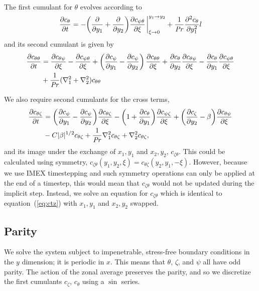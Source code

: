 \documentclass{jfm}
\newcommand{\cz}{c_{\zeta}}
\newcommand{\cs}{c_{\psi}}
\newcommand{\ct}{c_{\theta}}
\newcommand{\csz}{c_{\psi \zeta}}
\newcommand{\ctz}{c_{\theta \zeta}}
\newcommand{\czt}{c_{\zeta \theta}}
\newcommand{\ctt}{c_{\theta \theta}}
\newcommand{\cst}{c_{\psi \theta}}
\newcommand{\cts}{c_{\theta \psi}}
\begin{document}
The first cumulant for $\theta$ evolves according to
\begin{equation}
  \label{eq:ct}
  \pdv{\ct}{t} = - \qty(\pdv{y_1} + \pdv{y_2}) \pdv{\cst}{\xi} \eval_{\xi \to 0}^{y_1 \to y_2} + \frac{1}{\Pran} \pdv[2]{\ct}{y_1}l
\end{equation}
and its second cumulant is given by
\begin{equation}
  \label{eq:ctt}
\begin{split}
  \pdv{\ctt}{t} &= \pdv{\cts}{\xi} - \pdv{\cst}{\xi} + \left(\pdv{\cs}{y_1} - \pdv{\cs}{y_2}\right)\pdv{\ctt}{\xi} + \pdv{\ct}{y_2}\pdv{\cts}{\xi} - \pdv{\ct}{y_1}\pdv{\cst}{\xi}\\
&  + \frac{1}{\Pran}(\nabla_1^2 + \nabla_2^2) \ctt
\end{split}
\end{equation}

We also require second cumulants for the cross terms,
\begin{equation}
  \label{eq:ctz}
  \begin{split}
    \pdv{\ctz}{t} &= \qty(\pdv{\cs}{y_1} - \pdv{\cs}{y_2}) \pdv{\ctz}{\xi} - \qty(1 + \pdv{\ct}{y_1}) \pdv{\csz}{\xi} + \qty(\pdv{\cz}{y_2} - \beta) \pdv{\cts}{\xi}\\
    &  - C |\beta|^{1/2} \ctz + \frac{1}{\Pran} \nabla_1^2 \ctz + \nabla_2^2 \ctz,
  \end{split}
\end{equation}
and its image under the exchange of $x_1,y_1$ and $x_2, y_2$, $\czt$.
This could be calculated using symmetry, $\czt(y_1, y_2, \xi) = \ctz(y_2, y_1, -\xi)$.
However, because we use IMEX timestepping and such symmetry operations can only be applied at the end of a timestep, this would mean that $\czt$ would not be updated during the implicit step.
Instead, we solve an equation for $\czt$ which is identical to equation~(\ref{eq:ctz}) with $x_1,y_1$ and $x_2, y_2$ swapped.


\subsection{Parity}
\label{sec:parity}

We solve the system subject to impenetrable, stress-free boundary conditions in the $y$ dimension; it is periodic in $x$. 
This means that $\theta$, $\zeta$, and $\psi$ all have odd parity.
The action of the zonal average preserves the parity, and so we discretize the first cumulants $\cz$, $\ct$ using a $\sin$ series. 
\end{document}
